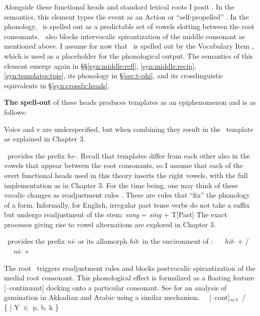 Alongside these functional heads and standard lexical roots I posit \textbf{\va}. In the semantics, this {element} types the event as an Action \citep{doron03} or ``self-propelled'' \citep{folliharley08}. In the phonology, \va~is spelled out as a predictable set of vowels slotting between the root consonants. \va~also blocks intervocalic spirantization of the middle consonant as mentioned above. I assume {for now} that \va~is spelled out by the Vocabulary Item , which is used as a placeholder for the phonological output. The semantics of this element emerge again in \S\S\ref{syn:middle:refl}, \ref{syn:middle:recip}, \ref{syn:templates:tpie}, its phonology in \S\ref{sec:t-phi}, and its crosslinguistic equivalents in \S\ref{syn:crosslx:heads}.

\textbf{The spell-out} of these heads produces templates as an epiphenomenon and is as follows: 

Voice and v are underspecified, but when combining they result in the \tkal~template as explained in Chapter 3.

\vd~provides the prefix \emph{he}-. Recall that templates differ from each other also in the vowels that appear between the root consonants, so I assume that each of the overt functional heads used in this theory inserts the right vowels, with the full implementation as in Chapter 3. For the time being, one may think of these vocalic changes as readjustment rules \citep{embickhalle05}. These are rules that ``fix'' the phonology of a form. Informally, for English, irregular past tense verbs do not take a suffix but undergo readjustment of the stem:
\ex \emph{sang} = \emph{sing} + T[Past]
\xe
The exact processes giving rise to vowel alternations are explored in Chapter 3.

\vz~provides the prefix \emph{ni}- or its allomorph \emph{hit}- in the environment of \va:
\pex
\a \vz~\lra~ \emph{hit}- +  / \trace~\va
\a \vz~\lra~ \emph{ni}- + 
\xe

The root \va~triggers readjustment rules and blocks postvocalic spirantization of the medial root consonant. This phonological effect is formalized as a floating feature [--continuant] docking onto a particular consonant. See \cite{katie13} for an analysis of gemination in Akkadian and Arabic using a similar mechanism.
\ex \va~\lra~[--cont]$_{\gsc{ACT}}$ / \trace~ \{  | Y $\in$ p, b, k \}
\xe

